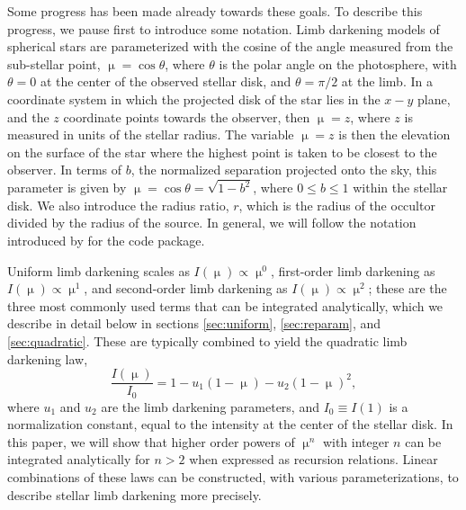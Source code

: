 \documentclass[modern,trackchanges]{aastex63}
\begin{document}
Some progress has been made already towards these goals.  To describe this
progress, we pause first to introduce some notation.  Limb darkening models
of spherical stars are parameterized with the cosine of the angle measured
from the sub-stellar point, $\upmu = \cos{\theta}$, where $\theta$ is the
polar angle on the photosphere, with $\theta=0$ at the center of the observed
stellar disk, and $\theta=\pi/2$ at the limb.  In a coordinate system in which
the projected disk of the star lies in the $x-y$ plane, and the $z$ coordinate
points towards the observer, then $\upmu = z$, where $z$ is measured in units
of the stellar radius.  The variable $\upmu=z$ is then the elevation on the
surface of the star where the highest point is taken to be closest to the observer.
In terms of $b$, the normalized separation projected onto
the sky, this parameter is given by $\upmu = \cos{\theta} =\sqrt{1-b^2}$, where
$0\le b \le 1$ within the stellar disk.  We also introduce the radius ratio,
$r$, which is the radius of the occultor divided by the radius of the source.
In general, we will follow the notation
introduced by \citet{starry} for the \starry code package.

Uniform limb darkening scales as $I(\upmu) \propto \upmu^0$, first-order
limb darkening as $I(\upmu) \propto \upmu^1$, and second-order limb darkening
as $I(\upmu)\propto \upmu^2$; these are the three most commonly used  terms
that can be integrated analytically, which we describe in detail below
in sections \ref{sec:uniform}, \ref{sec:reparam}, and \ref{sec:quadratic}.
These are typically combined to yield the quadratic limb darkening law,
%
\begin{equation} \label{eq:quadraticld}
    \frac{I(\upmu)}{I_0} = 1-u_1 (1-\upmu) - u_2 (1-\upmu)^2,
\end{equation}
%
where $u_1$ and $u_2$ are the limb darkening parameters, and
$I_0 \equiv I(1)$ is a normalization constant, equal to the
intensity at the center of the stellar disk.
In this paper, we will show that higher order powers of $\upmu^n$ with integer
$n$ can be integrated analytically for $n > 2$ when expressed as recursion relations.
Linear combinations of these laws can be constructed,
with various parameterizations, to describe stellar limb darkening more precisely.
\end{document}
